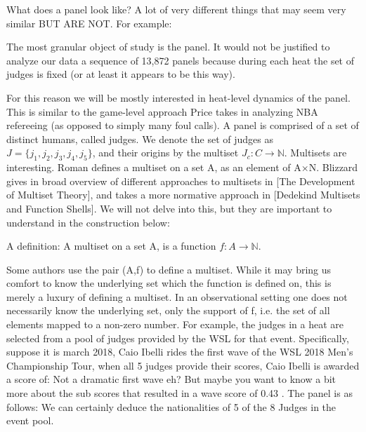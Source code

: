 \documentclass{article}
\theoremstyle{definition}
\begin{document}
What does a panel look like? A lot of very different things that may seem very similar BUT ARE NOT. For example:

The most granular object of study is the panel. It would not be justified to analyze our data a sequence of 13,872 panels because during each heat the set of judges is fixed (or at least it appears to be this way).

For this reason we will be mostly interested in heat-level dynamics of the panel. This is similar to the game-level approach Price takes in analyzing NBA refereeing (as opposed to simply many foul calls). A panel is comprised of a set of distinct humans, called judges. We denote the set of judges as $J=\{j_1, j_2, j_3,j_4, j_5\}$, and their origins by the multiset $J_c:C\rightarrow\mathbb{N}$. Multisets are interesting. Roman defines a multiset on a set A, as an element of A×N. Blizzard gives in broad overview of different approaches to multisets in [The Development of Multiset Theory], and takes a more normative approach in [Dedekind Multisets and Function Shells]. We will not delve into this, but they are important to understand in the construction below:

A definition: A multiset on a set A, is a function $f:A\rightarrow\mathbb{N}$.

Some authors use the pair (A,f) to define a multiset. While it may bring us comfort to know the underlying set which the function is defined on, this is merely a luxury of defining a multiset. In an observational setting one does not necessarily know the underlying set, only the support of f, i.e. the set of all elements mapped to a non-zero number. For example, the judges in a heat are selected from a pool of judges provided by the WSL for that event. Specifically, suppose it is march 
2018, Caio Ibelli rides the first wave of the WSL 2018 Men's Championship Tour, when all 5 judges provide their scores, Caio Ibelli is awarded a score of:
Not a dramatic first wave eh? But maybe you want to know a bit more about the sub scores that resulted in a wave score of 0.43 . The panel is as follows:
We can certainly deduce the nationalities of 5 of the 8 Judges in the event pool.
\end{document}
